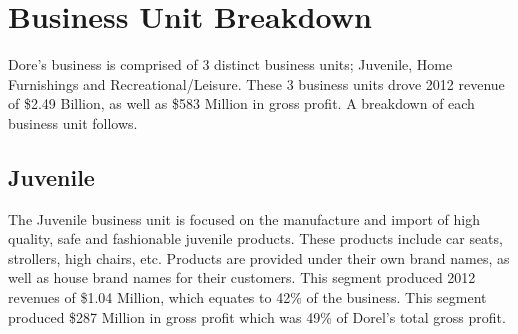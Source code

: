 \section{Business Unit Breakdown}
Dore’s business is comprised of 3 distinct business units; Juvenile, Home Furnishings and Recreational/Leisure.  These 3 business units drove 2012 revenue of \$2.49 Billion, as well as \$583 Million in gross profit. A breakdown of each business unit follows.

\subsection{Juvenile}
The Juvenile business unit is focused on the manufacture and import of high quality, safe and fashionable juvenile products.  These products include car seats, strollers, high chairs, etc.  Products are provided under their own brand names, as well as house brand names for their customers. This segment produced 2012 revenues of \$1.04 Million, which equates to 42\% of the business. This segment produced \$287 Million in gross profit which was 49\% of Dorel’s total gross profit.

